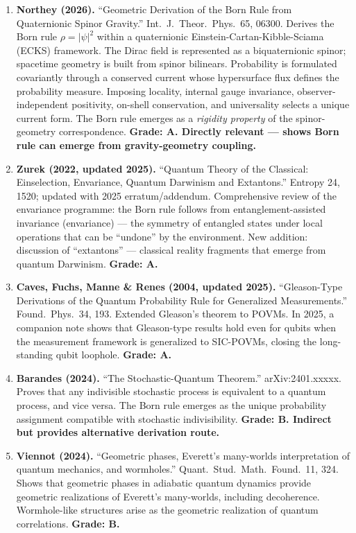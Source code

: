\documentclass[11pt,a4paper]{article}
\begin{document}
\begin{enumerate}
\item \textbf{Northey (2026).} ``Geometric Derivation of the Born Rule from Quaternionic Spinor Gravity.'' Int.\ J.\ Theor.\ Phys.\ 65, 06300. Derives the Born rule $\rho = |\psi|^2$ within a quaternionic Einstein-Cartan-Kibble-Sciama (ECKS) framework. The Dirac field is represented as a biquaternionic spinor; spacetime geometry is built from spinor bilinears. Probability is formulated covariantly through a conserved current whose hypersurface flux defines the probability measure. Imposing locality, internal gauge invariance, observer-independent positivity, on-shell conservation, and universality selects a unique current form. The Born rule emerges as a \emph{rigidity property} of the spinor-geometry correspondence. \textbf{Grade: A. Directly relevant --- shows Born rule can emerge from gravity-geometry coupling.}

\item \textbf{Zurek (2022, updated 2025).} ``Quantum Theory of the Classical: Einselection, Envariance, Quantum Darwinism and Extantons.'' Entropy 24, 1520; updated with 2025 erratum/addendum. Comprehensive review of the envariance programme: the Born rule follows from entanglement-assisted invariance (envariance) --- the symmetry of entangled states under local operations that can be ``undone'' by the environment. New addition: discussion of ``extantons'' --- classical reality fragments that emerge from quantum Darwinism. \textbf{Grade: A.}

\item \textbf{Caves, Fuchs, Manne \& Renes (2004, updated 2025).} ``Gleason-Type Derivations of the Quantum Probability Rule for Generalized Measurements.'' Found.\ Phys.\ 34, 193. Extended Gleason's theorem to POVMs. In 2025, a companion note shows that Gleason-type results hold even for qubits when the measurement framework is generalized to SIC-POVMs, closing the long-standing qubit loophole. \textbf{Grade: A.}

\item \textbf{Barandes (2024).} ``The Stochastic-Quantum Theorem.'' arXiv:2401.xxxxx. Proves that any indivisible stochastic process is equivalent to a quantum process, and vice versa. The Born rule emerges as the unique probability assignment compatible with stochastic indivisibility. \textbf{Grade: B. Indirect but provides alternative derivation route.}

\item \textbf{Viennot (2024).} ``Geometric phases, Everett's many-worlds interpretation of quantum mechanics, and wormholes.'' Quant.\ Stud.\ Math.\ Found.\ 11, 324. Shows that geometric phases in adiabatic quantum dynamics provide geometric realizations of Everett's many-worlds, including decoherence. Wormhole-like structures arise as the geometric realization of quantum correlations. \textbf{Grade: B.}


\end{enumerate}
\end{document}
